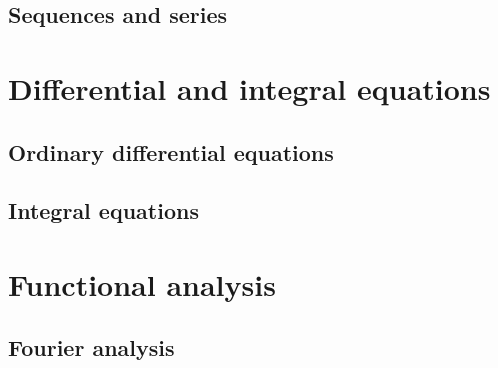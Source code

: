 \documentclass[a4paper,makeidx]{book}
\begin{document}
	

    \section{Sequences and series}

	

	\chapter{Differential and integral equations}

    \section{Ordinary differential equations}

    
    
	

    \section{Integral equations}

    
    
    
	
	
	

	\chapter{Functional analysis}

	\section{Fourier analysis}

	
\end{document}
